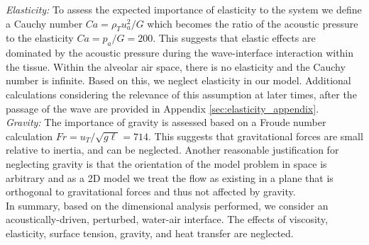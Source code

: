 \noindent\textit{Elasticity:} To assess the expected importance of elasticity to
the system we define a Cauchy number $Ca = \rho_T u_a^2/G$ which
becomes the ratio of the acoustic pressure to the elasticity
$ Ca = p_a/G = 200$. This suggests that elastic effects are dominated
by the acoustic pressure during the wave-interface interaction within
the tissue. Within the alveolar air space, there is no elasticity and
the Cauchy number is infinite. Based on this, we neglect elasticity in
our model. Additional calculations considering the relevance of this
assumption at later times, after the passage of
the wave are provided in Appendix \ref{sec:elasticity_appendix}.\\


\noindent\textit{Gravity:} The importance of gravity is assessed based on a
Froude number calculation $Fr= u_T / \sqrt{g \ell} = 714$. This
suggests that gravitational forces are small relative to inertia, and
can be neglected. Another reasonable justification for neglecting
gravity is that the orientation of the model problem in space is
arbitrary and as a 2D model we treat the flow as existing in a plane
that is orthogonal to gravitational forces and thus not affected by
gravity.\\

In summary, based on the dimensional analysis performed, we consider
an acoustically-driven, perturbed, water-air interface. The effects of
viscosity, elasticity, surface tension, gravity, and heat transfer are
neglected.

